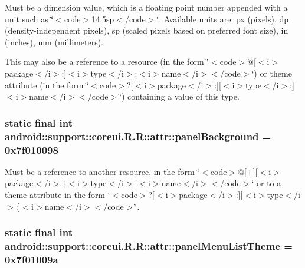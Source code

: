 Must be a dimension value, which is a floating point number appended with a unit such as \char`\"{}$<$code$>$14.5sp$<$/code$>$\char`\"{}. Available units are: px (pixels), dp (density-independent pixels), sp (scaled pixels based on preferred font size), in (inches), mm (millimeters). 

This may also be a reference to a resource (in the form \char`\"{}$<$code$>$@\mbox{[}$<$i$>$package$<$/i$>$:\mbox{]}$<$i$>$type$<$/i$>$:$<$i$>$name$<$/i$>$$<$/code$>$\char`\"{}) or theme attribute (in the form \char`\"{}$<$code$>$?\mbox{[}$<$i$>$package$<$/i$>$:\mbox{]}\mbox{[}$<$i$>$type$<$/i$>$:\mbox{]}$<$i$>$name$<$/i$>$$<$/code$>$\char`\"{}) containing a value of this type. \hypertarget{classandroid_1_1support_1_1coreui_1_1_r_1_1attr_a615663af971d222d32bdfaf3312341a}{
\subsubsection[{panelBackground}]{\setlength{\rightskip}{0pt plus 5cm}static final int android::support::coreui.R.R::attr::panelBackground = 0x7f010098}}
\label{classandroid_1_1support_1_1coreui_1_1_r_1_1attr_a615663af971d222d32bdfaf3312341a}


Must be a reference to another resource, in the form \char`\"{}$<$code$>$@\mbox{[}+\mbox{]}\mbox{[}$<$i$>$package$<$/i$>$:\mbox{]}$<$i$>$type$<$/i$>$:$<$i$>$name$<$/i$>$$<$/code$>$\char`\"{} or to a theme attribute in the form \char`\"{}$<$code$>$?\mbox{[}$<$i$>$package$<$/i$>$:\mbox{]}\mbox{[}$<$i$>$type$<$/i$>$:\mbox{]}$<$i$>$name$<$/i$>$$<$/code$>$\char`\"{}. \hypertarget{classandroid_1_1support_1_1coreui_1_1_r_1_1attr_078708f1b7acb7897b789ea54bfb178d}{
\subsubsection[{panelMenuListTheme}]{\setlength{\rightskip}{0pt plus 5cm}static final int android::support::coreui.R.R::attr::panelMenuListTheme = 0x7f01009a}}
\label{classandroid_1_1support_1_1coreui_1_1_r_1_1attr_078708f1b7acb7897b789ea54bfb178d}


